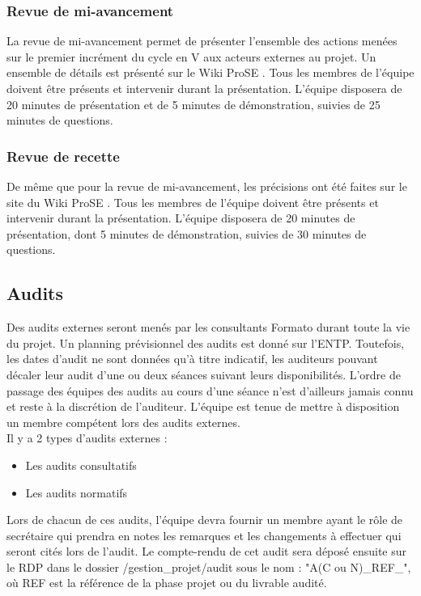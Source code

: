 \documentclass[a4paper,11pt,titlepage]{article}
\begin{document}
\subsubsection{Revue de mi-avancement}
La revue de mi-avancement permet de présenter l’ensemble des actions menées sur le premier incrément du cycle en V aux acteurs externes au projet. Un ensemble de détails est présenté sur le Wiki ProSE \cite[Wiki ProSE]{WIKI}. Tous les membres de l’équipe doivent être présents et intervenir durant la présentation. L’équipe disposera de 20 minutes de présentation et de 5 minutes de démonstration, suivies de 25 minutes de questions.
\subsubsection{Revue de recette}
De même que pour la revue de mi-avancement, les précisions ont été faites
sur le site du Wiki ProSE \cite[Wiki ProSE]{WIKI}.
Tous les membres de l'équipe doivent être présents et intervenir durant la
présentation. L'équipe disposera de 20 minutes de présentation, dont 5 minutes
de démonstration, suivies de 30 minutes de questions.
\subsection{Audits} \label{sec:Audits}
Des audits externes seront menés par les consultants Formato durant toute
la vie du projet. Un planning prévisionnel des audits est donné sur l'ENTP.
Toutefois, les dates d'audit ne sont données qu'à titre indicatif, les
auditeurs pouvant décaler leur audit d'une ou deux séances suivant leurs
disponibilités. L'ordre de passage des équipes des audits au cours d'une
séance n'est d'ailleurs jamais connu et reste à la discrétion de l'auditeur.
L'équipe est tenue de mettre à disposition un membre compétent lors des
audits externes.\\
Il y a 2 types d'audits externes :
\begin{itemize}
    \item Les audits consultatifs
    \item Les audits normatifs
\end{itemize}
Lors de chacun de ces audits, l'équipe devra fournir un membre ayant le rôle
de secrétaire qui prendra en notes les remarques et les changements à
effectuer qui seront cités lors de l'audit. Le compte-rendu de cet audit
sera déposé ensuite sur le RDP dans le dossier /gestion\_projet/audit sous
le nom :  "A(C ou N)\_REF\_\teamNumber", où REF est la référence de la phase projet
ou du livrable audité.
\end{document}
